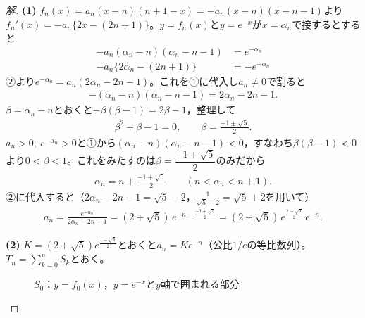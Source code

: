 \documentclass[../main.tex]{subfiles}
\begin{document}
\begin{proof}[解]
  \textbf{(1)} $f_n(x)=a_n(x-n)(n+1-x)=-a_n(x-n)(x-n-1)$より$f_n'(x)=-a_n\{2x-(2n+1)\}$。$y=f_n(x)$と$y=e^{-x}$が$x=\alpha_n$で接するとすると
  \begin{align*}
    -a_n(\alpha_n-n)(\alpha_n-n-1)&=e^{-\alpha_n}\tag{①}\\
    -a_n\{2\alpha_n-(2n+1)\}&=-e^{-\alpha_n}\tag{②}
  \end{align*}
  ②より$e^{-\alpha_n}=a_n(2\alpha_n-2n-1)$。これを①に代入し$a_n\neq0$で割ると
  \begin{align*}
    -(\alpha_n-n)(\alpha_n-n-1)=2\alpha_n-2n-1.
  \end{align*}
  $\beta=\alpha_n-n$とおくと$-\beta(\beta-1)=2\beta-1$，整理して
  \begin{align*}
    \beta^2+\beta-1=0,\qquad\beta=\frac{-1\pm\sqrt5}2.
  \end{align*}
  $a_n>0,\ e^{-\alpha_n}>0$と①から$(\alpha_n-n)(\alpha_n-n-1)<0$，すなわち$\beta(\beta-1)<0$より$0<\beta<1$。これをみたすのは$\beta=\dfrac{-1+\sqrt5}2$のみだから
  \begin{align*}
    \alpha_n=n+\frac{-1+\sqrt5}2\qquad(n<\alpha_n<n+1).
  \end{align*}
  ②に代入すると（$2\alpha_n-2n-1=\sqrt5-2$，$\frac1{\sqrt5-2}=\sqrt5+2$を用いて）
  \begin{align*}
    a_n=\frac{e^{-\alpha_n}}{2\alpha_n-2n-1}=(2+\sqrt5)\,e^{-n-\frac{-1+\sqrt5}2}=(2+\sqrt5)\,e^{\frac{1-\sqrt5}2}\,e^{-n}.
  \end{align*}

  \textbf{(2)} $K=(2+\sqrt5)e^{\frac{1-\sqrt5}2}$とおくと$a_n=Ke^{-n}$（公比$1/e$の等比数列）。$T_n=\displaystyle\sum_{k=0}^nS_k$とおく。

  \begin{figure}[htb]
    \centering
    \caption{$S_0$：$y=f_0(x)$，$y=e^{-x}$と$y$軸で囲まれる部分}
  \end{figure}


\end{proof}
\end{document}
